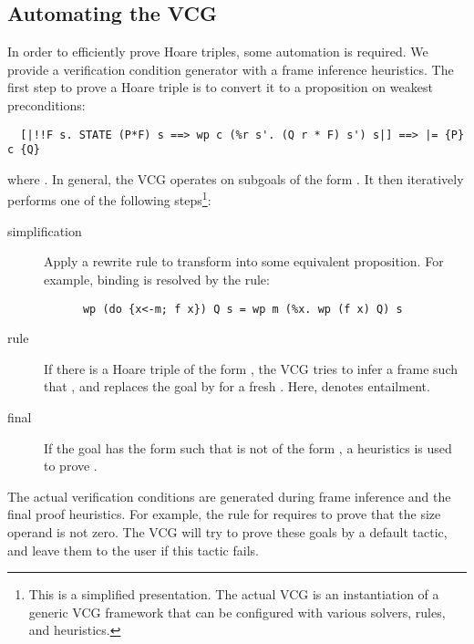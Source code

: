 \documentclass[a4paper,USenglish,cleveref, autoref]{lipics-v2019}
\begin{document}
\subsection{Automating the VCG}
In order to efficiently prove Hoare triples, some automation is required.
We provide a verification condition generator with a frame inference heuristics. 
The first step to prove a Hoare triple is to convert it to a proposition on weakest preconditions:
\begin{lstlisting}
  [|!!F s. STATE (P*F) s ==> wp c (%r s'. (Q r * F) s') s|] ==> |= {P} c {Q}
\end{lstlisting}
where .
In general, the VCG operates on subgoals of the form . 
It then iteratively performs one of the following steps\footnote{This is a simplified presentation. 
The actual VCG is an instantiation of a generic VCG framework that can be configured with various solvers, rules, and heuristics.}:
\begin{description}
  \item[simplification] Apply a rewrite rule to transform  into some equivalent proposition. For example,
    binding is resolved by the rule:
    \begin{lstlisting}
      wp (do {x<-m; f x}) Q s = wp m (%x. wp (f x) Q) s
    \end{lstlisting}
  \item[rule] If there is a Hoare triple of the form , the VCG tries to infer a frame  
  such that , and replaces the goal by  for a fresh . 
  Here,  denotes entailment.
  \item[final] If the goal has the form  such that  is not of the form , a heuristics is used to prove 
  .
\end{description}
The actual verification conditions are generated during frame inference and the final proof heuristics.
For example, the rule for  requires to prove that the size operand is not zero. 
The VCG will try to prove these goals by a default tactic, and leave them to the user if this tactic fails.
\end{document}
